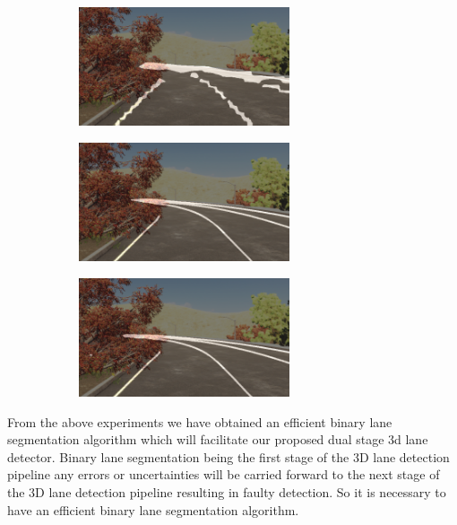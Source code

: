         \begin{figure}[h]
      \caption{Qualitative results for binary lane segmentation trained on sim3d dataset \cite{} for all the lanes present in the scene: (a) SCNN(Res18+Focal Loss) (b) RESA(Res18+Dice Loss) (c)RESA(Res18+Focal Loss)}
        \centering
        \begin{subfigure}{0.4\textwidth}
        \includegraphics[width=1\linewidth, height=3.5cm]{images/full_res18_scnn_focal.png} 
        \caption{}
        \label{fig:subim1}
        \end{subfigure}
        \begin{subfigure}{0.4\textwidth}
        \includegraphics[width=1\linewidth,height=3.5cm]{images/Resa_r18_full_dice.png}
        \caption{}
        \label{fig:subim2}
        \end{subfigure}
        \begin{subfigure}{0.4\textwidth}
        \includegraphics[width=1\linewidth, height=3.5cm]{images/Resa_r50_full_dice.png}
        \caption{}
        \label{fig:subim2}
        \end{subfigure}
        \label{fig:image2}
        \end{figure}
        
    From the above experiments we have obtained an efficient binary lane segmentation algorithm which will facilitate our proposed dual stage 3d lane detector. Binary lane segmentation being the first stage of the 3D lane detection pipeline any errors or uncertainties will be carried forward to the next stage of the 3D lane detection pipeline resulting in faulty detection. So it is necessary to have an efficient binary lane segmentation algorithm. 
    

